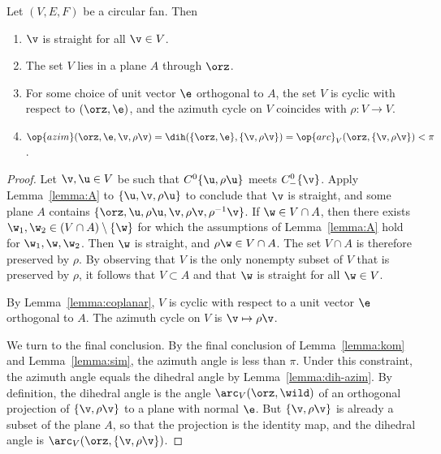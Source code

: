 \begin{lemma}
\label{lemma:circular}
Let $(V,E,F)$ be a circular fan. Then
\begin{enumerate}\wasitemize 
\item $\v$ is straight for all $\v\in V$.
\item The set $V$ lies in a plane $A$ through $\orz$.
\item For some choice of unit vector $\e$ orthogonal to $A$, the set
$V$ is cyclic with respect to $(\orz,\e)$, and the azimuth cycle on
$V$ coincides with $\rho:V\to V$.  
\item 
$
\op{azim}(\orz,\e,\v,\rho\v) = \dih(\{\orz,\e\},\{\v,\rho\v\})
=\op{arc}_V(\orz,\{\v,\rho \v\}) <\pi
$.
\end{enumerate}\wasitemize 
\end{lemma}

\begin{proof} Let $\v, \u\in V$ be such that $C^0\{\u,\rho \u\}$ meets
$C^0_-\{\v\}$.  Apply Lemma~\ref{lemma:A} to $\{\u,\v,\rho \u\}$ to
conclude that $\v$ is straight, and some plane $A$ contains
$\{\orz,\u,\rho\u,\v,\rho \v,\rho^{-1} \v\}$.  If
$\w\in V\cap A$, then there exists $\w_1,\w_2\in (V\cap
A)\setminus\{\w\}$ for which the assumptions of Lemma~\ref{lemma:A}
hold for $\w_1,\w,\w_2$.  
Then $\w$ is straight, and $\rho \w \in V\cap A$.  The set $V\cap
A$ is therefore preserved by $\rho$.  By observing that $V$ is the
only nonempty subset of $V$ that is preserved by $\rho$, it follows
that $V\subset A$ and that $\w$ is straight for all $\w\in V$.


By Lemma~\ref{lemma:coplanar}, $V$ is cyclic with respect to a unit
vector $\e$ orthogonal to $A$.  The azimuth cycle on $V$ is $\v
\mapsto \rho \v$.

We turn to the final conclusion.  By the final conclusion of
Lemma~\ref{lemma:kom} and Lemma~\ref{lemma:sim}, the azimuth angle is
less than $\pi$.  Under this constraint, the azimuth angle equals the
dihedral angle by Lemma~\ref{lemma:dih-azim}.  By definition, the
dihedral angle is the angle $\arc_V(\orz,\wild )$ of an orthogonal
projection of $\{\v,\rho\v\}$ to a plane with normal $\e$.  But
$\{\v,\rho\v\}$ is already a subset of the plane $A$, so that the
projection is the identity map, and the dihedral angle is
$\arc_V(\orz,\{\v,\rho\v\})$.
%
\end{proof}

